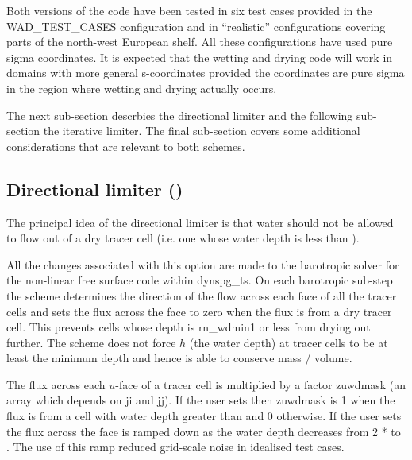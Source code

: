 \documentclass[../main/NEMO_manual]{subfiles}
\begin{document}
Both versions of the code have been tested in six test cases provided in the WAD\_TEST\_CASES configuration
and in ``realistic'' configurations covering parts of the north-west European shelf.
All these configurations have used pure sigma coordinates. It is expected that
the wetting and drying code will work in domains with more general s-coordinates provided
the coordinates are pure sigma in the region where wetting and drying actually occurs.

The next sub-section descrbies the directional limiter and the following sub-section the iterative limiter.
The final sub-section covers some additional considerations that are relevant to both schemes.

\subsection[Directional limiter (\textit{wet\_dry.F90})]{Directional limiter ()}
\label{subsec:DYN_wd_directional_limiter}

The principal idea of the directional limiter is that
water should not be allowed to flow out of a dry tracer cell (i.e. one whose water depth is less than ).

All the changes associated with this option are made to the barotropic solver for the non-linear
free surface code within dynspg\_ts.
On each barotropic sub-step the scheme determines the direction of the flow across each face of all the tracer cells
and sets the flux across the face to zero when the flux is from a dry tracer cell. This prevents cells
whose depth is rn\_wdmin1 or less from drying out further. The scheme does not force $h$ (the water depth) at tracer cells
to be at least the minimum depth and hence is able to conserve mass / volume.

The flux across each $u$-face of a tracer cell is multiplied by a factor zuwdmask (an array which depends on ji and jj).
If the user sets  then zuwdmask is 1 when the
flux is from a cell with water depth greater than  and 0 otherwise. If the user sets
 the flux across the face is ramped down as the water depth decreases
from 2 *  to . The use of this ramp reduced grid-scale noise in idealised test cases.
\end{document}
